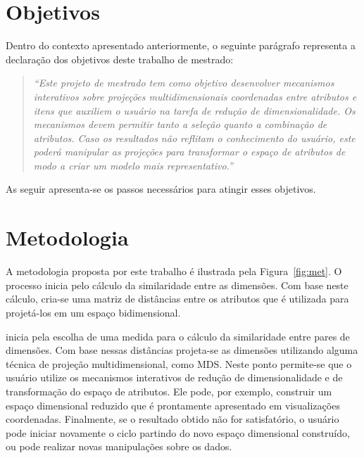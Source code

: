 \section{Objetivos}



Dentro do contexto apresentado anteriormente, o seguinte parágrafo representa a declaração dos objetivos deste trabalho de mestrado:

\begin{quote}
    \emph{``Este projeto de mestrado tem como objetivo desenvolver mecanismos interativos sobre projeções multidimensionais coordenadas entre atributos e itens que auxiliem o usuário na tarefa de redução de dimensionalidade. Os mecanismos devem permitir tanto a seleção quanto a combinação de atributos. Caso os resultados não reflitam o conhecimento do usuário, este poderá manipular as projeções para transformar o espaço de atributos de modo a criar um modelo mais representativo.''}
\end{quote}

As seguir apresenta-se os passos necessários para atingir esses objetivos.

\section{Metodologia}

A metodologia proposta por este trabalho é ilustrada pela Figura~\ref{fig:met}. O processo inicia pelo cálculo da similaridade entre as dimensões. Com base neste cálculo, cria-se uma matriz de distâncias entre os atributos que é utilizada para projetá-los em um espaço bidimensional.   

inicia pela escolha de uma medida para o cálculo da similaridade entre pares de dimensões. Com base nessas distâncias projeta-se as dimensões utilizando alguma técnica de projeção multidimensional, como MDS. Neste ponto permite-se que o usuário utilize os mecanismos interativos de redução de dimensionalidade e de transformação do espaço de atributos. Ele pode, por exemplo, construir um espaço dimensional reduzido que é prontamente apresentado em visualizações coordenadas. Finalmente, se o resultado obtido não for satisfatório, o usuário pode iniciar novamente o ciclo partindo do novo espaço dimensional construído, ou pode realizar novas manipulações sobre os dados.

